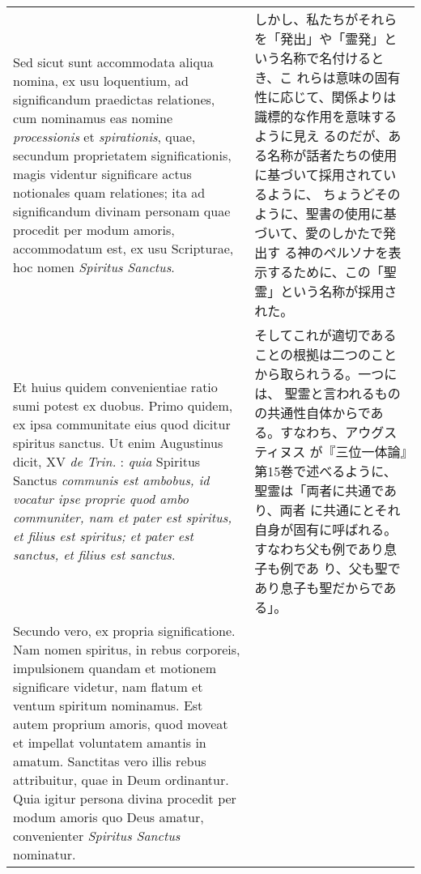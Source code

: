 \documentclass[10pt]{jsarticle} %
\begin{document}
\begin{longtable}{p{21em}p{21em}}
\\



Sed sicut sunt accommodata aliqua nomina, ex usu
loquentium, ad significandum praedictas relationes, cum nominamus eas
nomine {\itshape processionis} et {\itshape spirationis}, quae, secundum proprietatem
significationis, magis videntur significare actus notionales quam
relationes; ita ad significandum divinam personam quae procedit per
modum amoris, accommodatum est, ex usu Scripturae, hoc nomen {\itshape Spiritus
Sanctus}. 


&

しかし、私たちがそれらを「発出」や「霊発」という名称で名付けるとき、こ
 れらは意味の固有性に応じて、関係よりは識標的な作用を意味するように見え
 るのだが、ある名称が話者たちの使用に基づいて採用されているように、
ちょうどそのように、聖書の使用に基づいて、愛のしかたで発出す
 る神のペルソナを表示するために、この「聖霊」という名称が採用された。


\\



Et huius quidem convenientiae ratio sumi potest ex
duobus. Primo quidem, ex ipsa communitate eius quod dicitur spiritus
sanctus. Ut enim Augustinus dicit, XV {\itshape de Trin.} : {\itshape quia}
Spiritus Sanctus {\itshape communis est ambobus, id vocatur ipse proprie quod ambo communiter,
nam et pater est spiritus, et filius est spiritus; et pater est
sanctus, et filius est sanctus}. 



&

そしてこれが適切であることの根拠は二つのことから取られうる。一つには、
 聖霊と言われるものの共通性自体からである。すなわち、アウグスティヌス
 が『三位一体論』第15巻で述べるように、聖霊は「両者に共通であり、両者
 に共通にとそれ自身が固有に呼ばれる。すなわち父も例であり息子も例であ
 り、父も聖であり息子も聖だからである」。

\\



Secundo vero, ex propria
significatione. Nam nomen spiritus, in rebus corporeis, impulsionem
quandam et motionem significare videtur, nam flatum et ventum spiritum
nominamus. Est autem proprium amoris, quod moveat et impellat
voluntatem amantis in amatum. Sanctitas vero illis rebus attribuitur,
quae in Deum ordinantur. Quia igitur persona divina procedit per modum
amoris quo Deus amatur, convenienter {\itshape Spiritus Sanctus} nominatur.


\end{longtable}
\end{document}
